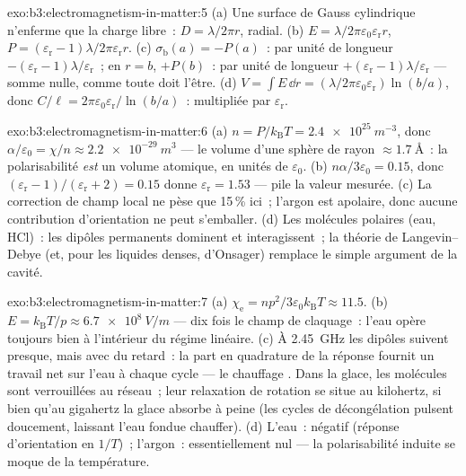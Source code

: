 \begin{solution}{exo:b3:electromagnetism-in-matter:5}
(a) Une surface de Gauss cylindrique n'enferme que la charge libre~:
$D = \lambda/2\pi r$, radial. (b) $E =
\lambda/2\pi\varepsilon_0\varepsilon_{\text{r}}r$, $P =
(\varepsilon_{\text{r}}-1)\lambda/2\pi\varepsilon_{\text{r}}r$.
(c) $\sigma_{\text{b}}(a) = -P(a)$~: par unité de longueur
$-(\varepsilon_{\text{r}}-1)\lambda/\varepsilon_{\text{r}}$~;
en $r = b$, $+P(b)$~: par unité de longueur
$+(\varepsilon_{\text{r}}-1)\lambda/\varepsilon_{\text{r}}$ ---
somme nulle, comme toute  doit l'être. (d) $V = \int E\,\dd r =
(\lambda/2\pi\varepsilon_0\varepsilon_{\text{r}})\ln(b/a)$, donc
$C/\ell = 2\pi\varepsilon_0\varepsilon_{\text{r}}/\ln(b/a)$~:
multipliée par $\varepsilon_{\text{r}}$.
\end{solution}

\begin{solution}{exo:b3:electromagnetism-in-matter:6}
(a) $n = P/k_{\text{B}}T = \qty{2.4e25}{m^{-3}}$, donc
$\alpha/\varepsilon_0 = \chi/n \approx \qty{2.2e-29}{m^3}$ ---
le volume d'une sphère de rayon $\approx\qty{1.7}{\angstrom}$~:
la polarisabilité \emph{est} un volume atomique, en unités de
$\varepsilon_0$. (b) $n\alpha/3\varepsilon_0 = 0.15$, donc $(\varepsilon_{\text{r}} -
1)/(\varepsilon_{\text{r}} + 2) = 0.15$ donne
$\varepsilon_{\text{r}} = 1.53$ --- pile la valeur mesurée.
(c) La correction de champ local ne pèse que 15\,\% ici~; l'argon est
apolaire, donc aucune contribution d'orientation ne peut s'emballer.
(d) Les molécules polaires (eau, HCl)~: les dipôles permanents
dominent et interagissent~; la théorie de Langevin--Debye (et, pour
les liquides denses, d'Onsager) remplace le simple argument de la
cavité.
\end{solution}

\begin{solution}{exo:b3:electromagnetism-in-matter:7}
(a) $\chi_{\text{e}} = np^2/3\varepsilon_0k_{\text{B}}T \approx
11.5$. (b) $E = k_{\text{B}}T/p \approx \qty{6.7e8}{V/m}$ ---
dix fois le champ de claquage~: l'eau opère toujours bien à
l'intérieur du régime linéaire. (c) À \qty{2.45}{GHz} les dipôles
suivent presque, mais avec du retard~: la part en quadrature de la
réponse fournit un travail net sur l'eau à chaque cycle --- le
chauffage . Dans la glace, les molécules sont
verrouillées au réseau~; leur relaxation de rotation se situe au
kilohertz, si bien qu'au gigahertz la glace absorbe à peine (les
cycles de décongélation pulsent doucement, laissant l'eau fondue
chauffer). (d) L'eau~: négatif (réponse d'orientation en $1/T$)~;
l'argon~: essentiellement nul --- la polarisabilité induite se moque
de la température.
\end{solution}


